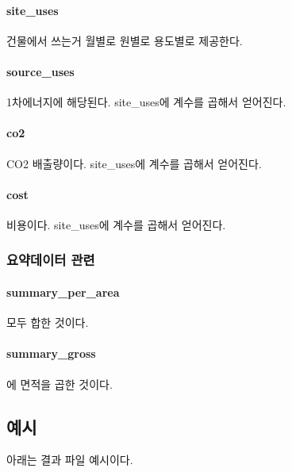 \paragraph{site\_uses} 건물에서 쓰는거 월별로 원별로 용도별로 제공한다.
\paragraph{source\_uses} 1차에너지에 해당된다. site\_uses에 계수를 곱해서 얻어진다.
\paragraph{co2} CO2 배출량이다. site\_uses에 계수를 곱해서 얻어진다.
\paragraph{cost} 비용이다. site\_uses에 계수를 곱해서 얻어진다.

\subsubsection{요약데이터 관련}
\paragraph{summary\_per\_area} 모두 합한 것이다.
\paragraph{summary\_gross} 에 면적을 곱한 것이다.

\subsection{예시}

아래는 결과 파일 예시이다.
